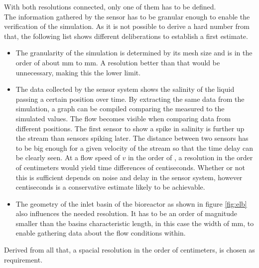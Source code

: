 With both resolutions connected, only one of them has to be defined. \\

The information gathered by the sensor has to be granular enough to enable the verification of the simulation. As it is not possible to derive a hard number from that, the following list shows different deliberations to establish a first estimate. \\

\begin{itemize}
\item The granularity of the simulation is determined by its mesh size and is in the order of about \unit[1]{mm} to \unit[5]{mm}. A resolution better than that would be unnecessary, making this the lower limit.

\item The data collected by the sensor system shows the salinity of the liquid passing a certain position over time. By extracting the same data from the simulation, a graph can be compiled comparing the measured to the simulated values. The flow becomes visible when comparing data from different positions. The first sensor to show a spike in salinity is further up the stream than sensors spiking later. The distance between two sensors has to be big enough for a given velocity of the stream so that the time delay can be clearly seen. At a flow speed of $ v $ in the order of , a resolution in the order of centimeters would yield time differences of centiseconds. Whether or not this is sufficient depends on noise and delay in the sensor system, however centiseconds is a conservative estimate likely to be achievable.

\item The geometry of the inlet basin of the bioreactor as shown in figure \ref{fig:elb} also influences the needed resolution. It has to be an order of magnitude smaller than the basins characteristic length, in this case the width of \unit[850]{mm}, to enable gathering data about the flow conditions within.
\end{itemize}

Derived from all that, a spacial resolution in the order of centimeters, is chosen as requirement.

